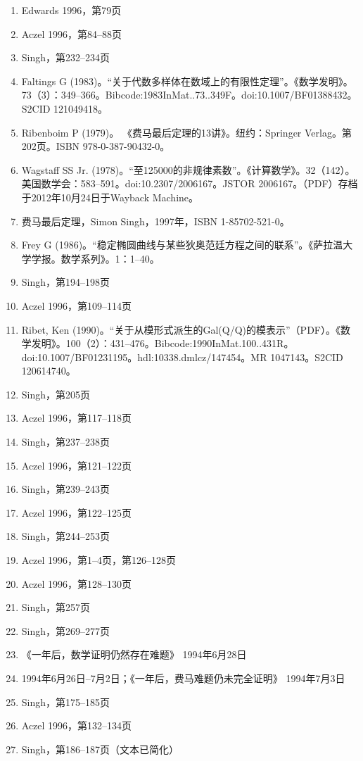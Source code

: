 \begin{enumerate}
\item Edwards 1996，第79页  
\item Aczel 1996，第84–88页  
\item Singh，第232–234页  
\item Faltings G (1983)。“关于代数多样体在数域上的有限性定理”。《数学发明》。73（3）：349–366。Bibcode:1983InMat..73..349F。doi:10.1007/BF01388432。S2CID 121049418。  
\item Ribenboim P (1979)。 《费马最后定理的13讲》。纽约：Springer Verlag。第202页。ISBN 978-0-387-90432-0。
\item Wagstaff SS Jr. (1978)。“至125000的非规律素数”。《计算数学》。32（142）。美国数学会：583–591。doi:10.2307/2006167。JSTOR 2006167。（PDF）存档于2012年10月24日于Wayback Machine。  
\item 费马最后定理，Simon Singh，1997年，ISBN 1-85702-521-0。  
\item Frey G (1986)。“稳定椭圆曲线与某些狄奥范廷方程之间的联系”。《萨拉温大学学报。数学系列》。1：1–40。  
\item Singh，第194–198页  
\item Aczel 1996，第109–114页  
\item Ribet, Ken (1990)。“关于从模形式派生的Gal(Q/Q)的模表示”（PDF）。《数学发明》。100（2）：431–476。Bibcode:1990InMat.100..431R。doi:10.1007/BF01231195。hdl:10338.dmlcz/147454。MR 1047143。S2CID 120614740。  
\item Singh，第205页  
\item Aczel 1996，第117–118页  
\item Singh，第237–238页  
\item Aczel 1996，第121–122页  
\item Singh，第239–243页  
\item Aczel 1996，第122–125页
\item Singh，第244–253页  
\item Aczel 1996，第1–4页，第126–128页  
\item Aczel 1996，第128–130页  
\item Singh，第257页  
\item Singh，第269–277页  
\item 《一年后，数学证明仍然存在难题》 1994年6月28日  
\item 1994年6月26日–7月2日；《一年后，费马难题仍未完全证明》 1994年7月3日  
\item Singh，第175–185页  
\item Aczel 1996，第132–134页  
\item Singh，第186–187页（文本已简化）  

\end{enumerate}
